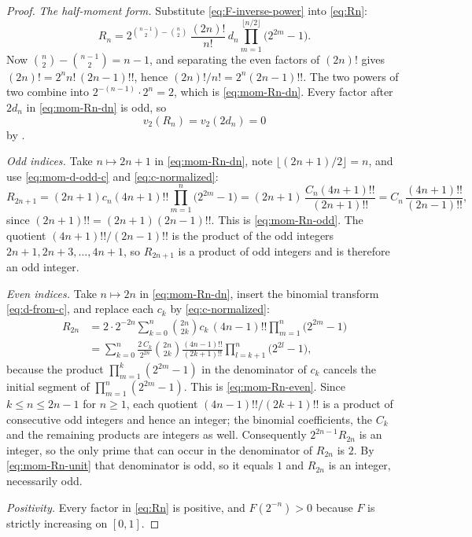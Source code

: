 \documentclass[11pt,oneside]{article}
\theoremstyle{definition}
\theoremstyle{remark}
\newcommand{\vtwo}{v_2}
\begin{document}
\begin{proof}
\emph{The half-moment form.}  Substitute \eqref{eq:F-inverse-power} into \eqref{eq:Rn}:
\begin{equation*}
 R_n=2^{\binom{n-1}{2}-\binom n2}\,\frac{(2n)!}{n!}\,d_n
 \prod_{m=1}^{\lfloor n/2\rfloor}\bigl(2^{2m}-1\bigr).
\end{equation*}
Now $\binom n2-\binom{n-1}{2}=n-1$, and separating the even factors of $(2n)!$ gives
$(2n)!=2^nn!\,(2n-1)!!$, hence $(2n)!/n!=2^n(2n-1)!!$.  The two powers of two combine into
$2^{-(n-1)}\cdot2^n=2$, which is \eqref{eq:mom-Rn-dn}.  Every factor after $2d_n$ in
\eqref{eq:mom-Rn-dn} is odd, so
\begin{equation}
 \vtwo(R_n)=\vtwo(2d_n)=0                                   \label{eq:mom-Rn-unit}
\end{equation}
by .

\emph{Odd indices.}  Take $n\mapsto2n+1$ in \eqref{eq:mom-Rn-dn}, note
$\lfloor(2n+1)/2\rfloor=n$, and use \eqref{eq:mom-d-odd-c} and \eqref{eq:c-normalized}:
\begin{equation*}
 R_{2n+1}=(2n+1)c_n(4n+1)!!\prod_{m=1}^{n}\bigl(2^{2m}-1\bigr)
 =(2n+1)\,\frac{C_n(4n+1)!!}{(2n+1)!!}
 =C_n\,\frac{(4n+1)!!}{(2n-1)!!},
\end{equation*}
since $(2n+1)!!=(2n+1)(2n-1)!!$.  This is \eqref{eq:mom-Rn-odd}.  The quotient
$(4n+1)!!/(2n-1)!!$ is the product of the odd integers $2n+1,2n+3,\ldots,4n+1$, so
$R_{2n+1}$ is a product of odd integers and is therefore an odd integer.

\emph{Even indices.}  Take $n\mapsto2n$ in \eqref{eq:mom-Rn-dn}, insert the binomial
transform \eqref{eq:d-from-c}, and replace each $c_k$ by \eqref{eq:c-normalized}:
\begin{align*}
 R_{2n}&=2\cdot2^{-2n}\sum_{k=0}^{n}\binom{2n}{2k}c_k\,(4n-1)!!
 \prod_{m=1}^{n}\bigl(2^{2m}-1\bigr)\\
 &=\sum_{k=0}^{n}\frac{2\,C_k}{2^{2n}}\binom{2n}{2k}
 \frac{(4n-1)!!}{(2k+1)!!}\prod_{l=k+1}^{n}\bigl(2^{2l}-1\bigr),
\end{align*}
because the product $\prod_{m=1}^{k}(2^{2m}-1)$ in the denominator of $c_k$ cancels the
initial segment of $\prod_{m=1}^{n}(2^{2m}-1)$.  This is \eqref{eq:mom-Rn-even}.  Since
$k\le n\le2n-1$ for $n\ge1$, each quotient $(4n-1)!!/(2k+1)!!$ is a product of consecutive
odd integers and hence an integer; the binomial coefficients, the $C_k$ and the remaining
products are integers as well.  Consequently $2^{2n-1}R_{2n}$ is an integer, so the only
prime that can occur in the denominator of $R_{2n}$ is $2$.  By \eqref{eq:mom-Rn-unit} that
denominator is odd, so it equals $1$ and $R_{2n}$ is an integer, necessarily odd.

\emph{Positivity.}  Every factor in \eqref{eq:Rn} is positive, and $F(2^{-n})>0$ because $F$
is strictly increasing on $[0,1]$.
\end{proof}
\end{document}
